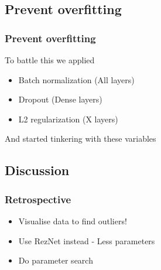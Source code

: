 \documentclass{beamer}
\begin{document}
\subsection{Prevent overfitting}
\begin{frame}
  \frametitle{Prevent overfitting}
  To battle this we applied
  \begin{itemize}
    \item Batch normalization (All layers)
    \item Dropout (Dense layers)
    \item L2 regularization (X layers)
  \end{itemize}
  And started tinkering with these variables
\end{frame}

















\subsection{Discussion}
\begin{frame}
  \frametitle{Retrospective}
  \begin{itemize}
    \item Visualise data to find outliers!
    \item Use RezNet instead - Less parameters
    \item Do parameter search
  \end{itemize}
\end{frame}
\end{document}
